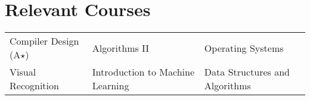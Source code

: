 \section*{Relevant Courses}
\begin{tabularx}{\textwidth}{X X X}
    Compiler Design (A$\star$) &
    Algorithms II &
    Operating Systems \\
    Visual Recognition &
    Introduction to Machine Learning &
    Data Structures and Algorithms
\end{tabularx}

